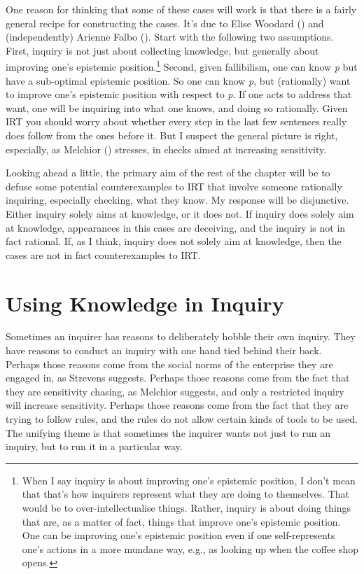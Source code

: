 \documentclass[
  10pt,
  letterpaper,
  twoside]{scrbook}
\begin{document}
One reason for thinking that some of these cases will work is that there
is a fairly general recipe for constructing the cases. It's due to Elise
Woodard () and (independently)
Arienne Falbo (). Start with the following
two assumptions. First, inquiry is not just about collecting knowledge,
but generally about improving one's epistemic position.\footnote{When I
  say inquiry is about improving one's epistemic position, I don't mean
  that that's how inquirers represent what they are doing to themselves.
  That would be to over-intellectualise things. Rather, inquiry is about
  doing things that are, as a matter of fact, things that improve one's
  epistemic position. One can be improving one's epistemic position even
  if one self-represents one's actions in a more mundane way, e.g., as
  looking up when the coffee shop opens.} Second, given fallibilism, one
can know \emph{p} but have a sub-optimal epistemic position. So one can
know \emph{p}, but (rationally) want to improve one's epistemic position
with respect to \emph{p}. If one acts to address that want, one will be
inquiring into what one knows, and doing so rationally. Given IRT you
should worry about whether every step in the last few sentences really
does follow from the ones before it. But I suspect the general picture
is right, especially, as Melchior ()
stresses, in checks aimed at increasing sensitivity.

Looking ahead a little, the primary aim of the rest of the chapter will
be to defuse some potential counterexamples to IRT that involve someone
rationally inquiring, especially checking, what they know. My response
will be disjunctive. Either inquiry solely aims at knowledge, or it does
not. If inquiry does solely aim at knowledge, appearances in this cases
are deceiving, and the inquiry is not in fact rational. If, as I think,
inquiry does not solely aim at knowledge, then the cases are not in fact
counterexamples to IRT.

\section{Using Knowledge in Inquiry}\label{sec-irtinquiry}

Sometimes an inquirer has reasons to deliberately hobble their own
inquiry. They have reasons to conduct an inquiry with one hand tied
behind their back. Perhaps those reasons come from the social norms of
the enterprise they are engaged in, as Strevens suggests. Perhaps those
reasons come from the fact that they are sensitivity chasing, as
Melchior suggests, and only a restricted inquiry will increase
sensitivity. Perhaps those reasons come from the fact that they are
trying to follow rules, and the rules do not allow certain kinds of
tools to be used. The unifying theme is that sometimes the inquirer
wants not just to run an inquiry, but to run it in a particular way.
\end{document}
